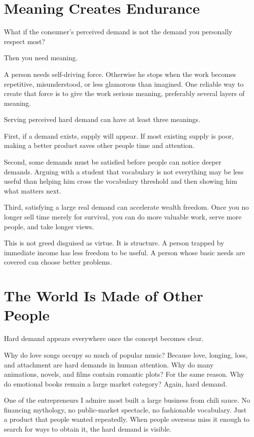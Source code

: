 \section*{Meaning Creates Endurance}

What if the consumer's perceived demand is not the demand you personally respect most?

Then you need meaning.

A person needs self-driving force. Otherwise he stops when the work becomes repetitive, misunderstood, or less glamorous than imagined. One reliable way to create that force is to give the work serious meaning, preferably several layers of meaning.

Serving perceived hard demand can have at least three meanings.

First, if a demand exists, supply will appear. If most existing supply is poor, making a better product saves other people time and attention.

Second, some demands must be satisfied before people can notice deeper demands. Arguing with a student that vocabulary is not everything may be less useful than helping him cross the vocabulary threshold and then showing him what matters next.

Third, satisfying a large real demand can accelerate wealth freedom. Once you no longer sell time merely for survival, you can do more valuable work, serve more people, and take longer views.

This is not greed disguised as virtue. It is structure. A person trapped by immediate income has less freedom to be useful. A person whose basic needs are covered can choose better problems.

\section*{The World Is Made of Other People}

Hard demand appears everywhere once the concept becomes clear.

Why do love songs occupy so much of popular music? Because love, longing, loss, and attachment are hard demands in human attention. Why do many animations, novels, and films contain romantic plots? For the same reason. Why do emotional books remain a large market category? Again, hard demand.

One of the entrepreneurs I admire most built a large business from chili sauce. No financing mythology, no public-market spectacle, no fashionable vocabulary. Just a product that people wanted repeatedly. When people overseas miss it enough to search for ways to obtain it, the hard demand is visible.

